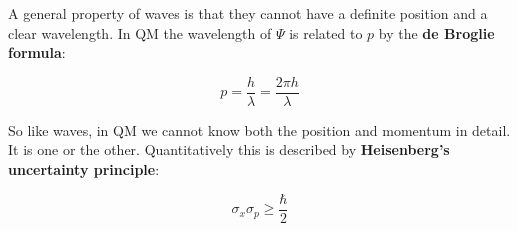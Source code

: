 \documentclass[a4paper]{article}
\begin{document}
A general property of waves is that they cannot have a definite position and a clear wavelength. In QM the wavelength of $\Psi$ is related to $p$ by the \textbf{de Broglie formula}:

\begin{equation}
    p=\frac{h}{\lambda}=\frac{2\pi h}{\lambda}
\end{equation}

So like waves, in QM we cannot know both the position and momentum in detail. It is one or the other. Quantitatively this is described by \textbf{Heisenberg's uncertainty principle}:

\begin{equation}
    \sigma_x\sigma_p\ge\frac{\hbar}{2}
\end{equation}
\end{document}
